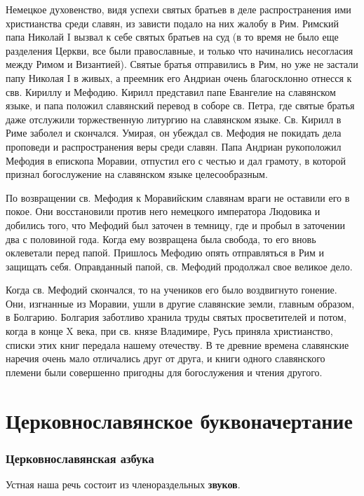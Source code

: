 \documentclass[11pt,a4paper,oneside]{memoir}
\begin{document}
    Немецкое духовенство, видя успехи святых братьев в деле распространения ими христианства среди славян, из зависти подало на них жалобу в Рим. Римский папа Николай I вызвал к себе святых братьев на суд (в то время не было еще разделения Церкви, все были православные, и только что начинались несогласия между Римом и Византией). Святые братья отправились в Рим, но уже не застали папу Николая I в живых, а преемник его Андриан очень благосклонно отнесся к свв. Кириллу и Мефодию. Кирилл представил папе Евангелие на славянском языке, и папа положил славянский перевод в соборе св. Петра, где святые братья даже отслужили торжественную литургию на славянском языке. Св. Кирилл в Риме заболел и скончался. Умирая, он убеждал св. Мефодия не покидать дела проповеди и распространения веры среди славян. Папа Андриан рукоположил Мефодия в епископа Моравии, отпустил его с честью и дал грамоту, в которой признал богослужение на славянском языке целесообразным.

    По возвращении св. Мефодия к Моравийским славянам враги не оставили его в покое. Они восстановили против него немецкого императора Людовика и добились того, что Мефодий был заточен в темницу, где и пробыл в заточении два с половиной года. Когда ему возвращена была свобода, то его вновь оклеветали перед папой. Пришлось Мефодию опять отправляться в Рим и защищать себя. Оправданный папой, св. Мефодий продолжал свое великое дело.

    Когда св. Мефодий скончался, то на учеников его было воздвигнуто гонение. Они, изгнанные из Моравии, ушли в другие славянские земли, главным образом, в Болгарию. Болгария заботливо хранила труды святых просветителей и потом, когда в конце X века, при св. князе Владимире, Русь приняла христианство, списки этих книг передала нашему отечеству. В те древние времена славянские наречия очень мало отличались друг от друга, и книги одного славянского племени были совершенно пригодны для богослужения и чтения другого.


        \section{Церковнославянское буквоначертание}
                \subsubsection{Церковнославянская азбука}

    Устная наша речь состоит из членораздельных \textbf{звуков}.
\end{document}

